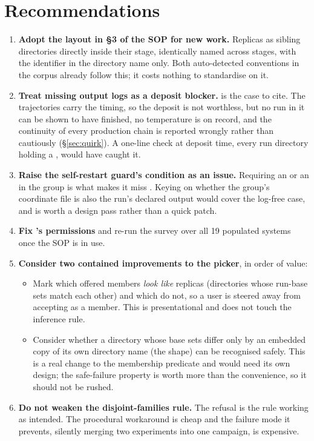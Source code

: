 \documentclass[11pt]{article}
\begin{document}
\section{Recommendations}

\begin{enumerate}
  \item \textbf{Adopt the layout in \S3 of the SOP for new work.} Replicas as sibling
        directories directly inside their stage, identically named across stages, with
        the identifier in the directory name only. Both auto-detected conventions in the
        corpus already follow this; it costs nothing to standardise on it.

  \item \textbf{Treat missing output logs as a deposit blocker.}  is the
        case to cite. The trajectories carry the timing, so the deposit is not worthless,
        but no run in it can be shown to have finished, no temperature is on record, and
        the continuity of every production chain is reported wrongly rather than
        cautiously (\S\ref{sec:quirk}). A one-line check at deposit time, every run
        directory holding a , would have caught it.

  \item \textbf{Raise the self-restart guard's condition as an issue.} Requiring an
         or an  in the group is what makes it miss
        . Keying on whether the group's coordinate file is also the run's
        declared output would cover the log-free case, and is worth a design pass rather
        than a quick patch.

  \item \textbf{Fix 's permissions} and re-run the survey over all 19
        populated systems once the SOP is in use.

  \item \textbf{Consider two contained improvements to the picker}, in order of value:
        \begin{itemize}
          \item Mark which offered members \emph{look like} replicas (directories whose
                run-base sets match each other) and which do not, so a user is steered
                away from accepting  as a member. This is presentational and
                does not touch the inference rule.
          \item Consider whether a directory whose base sets differ only by an embedded
                copy of its own directory name (the  shape) can be
                recognised safely. This is a real change to the membership predicate and
                would need its own design; the safe-failure property is worth more than
                the convenience, so it should not be rushed.
        \end{itemize}

  \item \textbf{Do not weaken the disjoint-families rule.} The  refusal is
        the rule working as intended. The procedural workaround is cheap and the failure
        mode it prevents, silently merging two experiments into one campaign, is
        expensive.
\end{enumerate}
\end{document}
